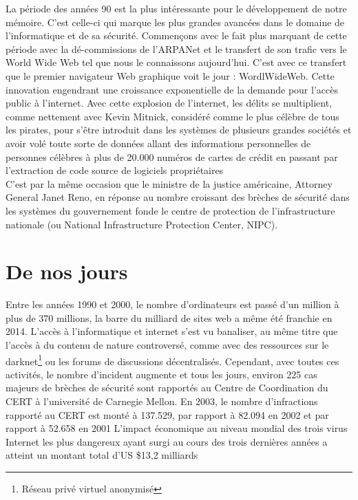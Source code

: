 \documentclass[a4paper]{memoir}
\begin{document}
La période des années 90 est la plus intéressante pour le développement de notre mémoire. C'est celle-ci qui marque les plus grandes avancées dans le domaine de l'informatique et de sa sécurité.
Commençons avec le fait plus marquant de cette période avec la dé-commissions de l'ARPANet et le transfert de son trafic vers le World Wide Web tel que nous le connaissons aujourd'hui. C'est avec ce transfert que le premier navigateur Web graphique voit le jour : WordlWideWeb. Cette innovation engendrant une croissance exponentielle de la demande pour l'accès public à l'internet. Avec cette explosion de l'internet, les délits se multiplient, comme nettement avec Kevin Mitnick, considéré comme le plus célèbre de tous les pirates, pour s'être introduit dans les systèmes de plusieurs grandes sociétés et avoir volé toute sorte de données allant des informations personnelles de personnes célèbres à plus de 20.000 numéros de cartes de crédit en passant par l'extraction de code source de logiciels propriétaires \\
\noindent C'est par la même occasion que le ministre de la justice américaine, Attorney General Janet Reno, en réponse au nombre croissant des brèches de sécurité dans les systèmes du gouvernement fonde le centre de protection de l'infrastructure nationale (ou National Infrastructure Protection Center, NIPC).


\section{De nos jours}

Entre les années 1990 et 2000, le nombre d'ordinateurs est passé d'un million à plus de 370 millions, la barre du milliard de sites web a même été franchie en 2014. L'accès à l'informatique et internet s'est vu banaliser, au même titre que l'accès à du contenu de nature controversé, comme avec des ressources sur le darknet\footnote{Réseau privé virtuel anonymisé} ou les forums de discussions décentralisés.
Cependant, avec toutes ces activités, le nombre d'incident augmente et tous les jours, environ 225 cas majeurs de brèches de sécurité sont rapportés au Centre de Coordination du CERT à l'université de Carnegie Mellon.
En 2003, le nombre d'infractions rapporté au CERT est monté à 137.529, par rapport à 82.094 en 2002 et par rapport à 52.658 en 2001
L'impact économique au niveau mondial des trois virus Internet les plus dangereux ayant surgi au cours des trois dernières années a atteint un montant total d’US \$13,2 milliards\\
\end{document}
